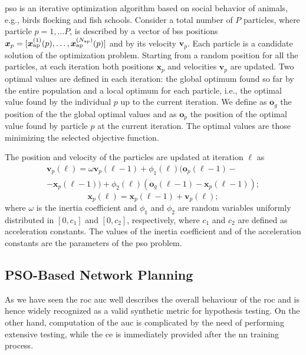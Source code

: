 \documentclass[conference,draftcls,onecolumn]{IEEEtran}
\begin{document}
\ac{pso} is an iterative optimization algorithm based on social behavior of animals, e.g., birds flocking and fish schools. Consider a total number of $P$ particles, where  particle $p=1, \ldots P$, is described by a vector of \acp{bs} positions $\bm{x}_p = [\bm{x}_{\rm ap}^{(1)}(p),\ldots, \bm{x}_{\rm ap}^{(N_{\rm ap})}(p)]$ and by its velocity $\bm{v}_p$.  Each particle is a candidate solution of the optimization problem. Starting from a random position for all the particles, at each iteration both  positions $\bm{x}_p$ and  velocities $\bm{v}_p$ are updated. Two optimal values are defined in each iteration: the global optimum found so far by the entire population and a local optimum for each particle, i.e., the optimal value found by the individual $p$ up to the current iteration. We define as $\bm{o}_g$ the position of the the global optimal values and as $\bm{o}_p$ the position of the optimal value found by particle $p$ at the current iteration. The optimal values are those minimizing the selected objective function.

The position and velocity of the particles are updated at iteration $\ell$ as \cite{Kennedy-11}
   \begin{equation}\label{eq: v up}
\begin{split}
  \bm{v}_p(\ell) = \omega \bm{v}_p(\ell-1)+\phi_1(\ell)(\bm{o}_p(\ell-1)-\\
  -\bm{x}_p(\ell-1))+\phi_2(\ell)(\bm{o}_g(\ell-1)-\bm{x}_p(\ell-1));
  \end{split}
  \end{equation}
  \begin{equation}\label{eq: p up}
  \bm{x}_p(\ell) = \bm{x}_p(\ell-1) + \bm{v}_p(\ell);
 \end{equation}
where $\omega$ is the inertia coefficient and $\phi_1$ and $\phi_2$ are random variables uniformly distributed in $[0,c_1]$ and $[0,c_2]$, respectively, where $c_1$ and $c_2$ are defined as acceleration constants. The values of the inertia coefficient and of the acceleration constants are the parameters of the \ac{pso} problem.

\subsection{PSO-Based Network Planning}

As we have seen the \ac{roc} \ac{auc} well describes the overall behaviour of the \ac{roc} and is hence widely recognized as a valid synthetic metric for hypothesis testing. On the other hand, computation of the \ac{auc} is complicated by the need of performing extensive testing, while the \ac{ce} is immediately provided after the \ac{nn} training process. 
\end{document}
